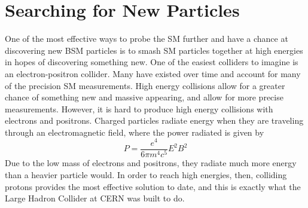 \chapter{Searching for New Particles}\label{Sec:CMS}

One of the most effective ways to probe the SM further and have a chance at discovering new BSM particles is to smash SM particles together at high energies in hopes of discovering something new. One of the easiest colliders to imagine is an electron-positron collider. Many have existed over time and account for many of the precision SM measurements. High energy collisions allow for a greater chance of something new and massive appearing, and allow for more precise measurements. However, it is hard to produce high energy collisions with electrons and positrons. Charged particles radiate energy when they are traveling through an electromagnetic field, where the power radiated is given by
\begin{equation}\label{Eq:SynchRad}
   P = \frac{e^4}{6\pi m^4c^5}E^2B^2
\end{equation}
Due to the low mass of electrons and positrons, they radiate much more energy than a heavier particle would. In order to reach high energies, then, colliding protons provides the most effective solution to date, and this is exactly what the Large Hadron Collider at CERN was built to do.
\vspace{5mm}


